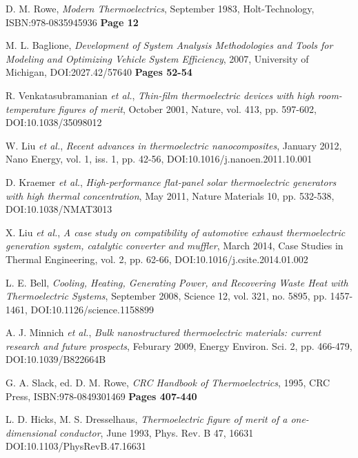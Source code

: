 \documentclass[12pt]{article}
\begin{document}
\begin{thebibliography}{11}

D. M. Rowe,
\emph{Modern Thermoelectrics},
September 1983,
Holt-Technology,
ISBN:978-0835945936
\textbf{Page 12}

M. L. Baglione,
\emph{Development of System Analysis Methodologies and Tools for Modeling and Optimizing Vehicle System Efficiency},
2007,
University of Michigan,
DOI:2027.42/57640
\textbf{Pages 52-54}

R. Venkatasubramanian \emph{et al.},
\emph{Thin-film thermoelectric devices with high room-temperature figures of merit},
October 2001,
Nature, vol. 413, pp. 597-602,
DOI:10.1038/35098012

W. Liu \emph{et al.},
\emph{Recent advances in thermoelectric nanocomposites},
January 2012,
Nano Energy, vol. 1, iss. 1, pp. 42-56,
DOI:10.1016/j.nanoen.2011.10.001

D. Kraemer \emph{et al.},
\emph{High-performance flat-panel solar thermoelectric
generators with high thermal concentration},
May 2011,
Nature Materials 10, pp. 532-538,
DOI:10.1038/NMAT3013

X. Liu \emph{et al.},
\emph{A case study on compatibility of automotive exhaust thermoelectric generation system, catalytic converter and muffler},
March 2014,
Case Studies in Thermal Engineering, vol. 2, pp. 62-66,
DOI:10.1016/j.csite.2014.01.002

L. E. Bell,
\emph{Cooling, Heating, Generating Power, and Recovering Waste Heat with Thermoelectric Systems},
September 2008,
Science 12, vol. 321, no. 5895, pp. 1457-1461,
DOI:10.1126/science.1158899

A. J. Minnich \emph{et al.},
\emph{Bulk nanostructured thermoelectric materials: current research and future prospects},
Feburary 2009,
Energy Environ. Sci. 2, pp. 466-479,
DOI:10.1039/B822664B

G. A. Slack, ed. D. M. Rowe,
\emph{CRC Handbook of Thermoelectrics},
1995,
CRC Press,
ISBN:978-0849301469
\textbf{Pages 407-440}

L. D. Hicks, M. S. Dresselhaus,
\emph{Thermoelectric figure of merit of a one-dimensional conductor},
June 1993,
Phys. Rev. B 47, 16631
DOI:10.1103/PhysRevB.47.16631


\end{thebibliography}
\end{document}

